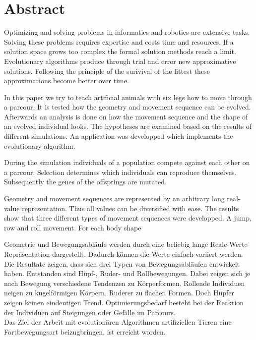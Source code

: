 %
%


\chapter{Abstract}

  Optimizing and solving problems in informatics and robotics are extensive tasks.
  Solving these problems requires expertise and costs time and resources.
  If a solution space grows too complex the formal solution methods reach a limit.
  Evolutionary algorithms produce through trial and error new approximative solutions.
  Following the principle of the surivival of the fittest these approximations become better over time.

  \smallskip

  In this paper we try to teach artificial animals with six legs how to move through a parcour.
  It is tested how the geometry and movement sequence can be evolved.
  Afterwards an analysis is done on how the movement sequence and the shape of an evolved individual looks.
  The hypotheses are examined based on the results of different simulations.
  An application was developped which implements the evolutionary algorithm.

  \smallskip

  During the simulation individuals of a population compete against each other on a parcour.
  Selection determines which individuals can reproduce themselves.
  Subsequently the genes of the offsprings are mutated.

  \smallskip

  Geometry and movement sequences are represented by an arbitrary long real-value representation.
  Thus all values can be diversified with ease.
  The results show that three different types of movement sequences were developped.
  A jump, row and roll movement.
  For each body shape 

  Geometrie und Bewegungsabläufe werden durch eine beliebig lange Reale-Werte-Repräsentation dargestellt.
  Dadurch können die Werte einfach variiert werden.
  Die Resultate zeigen, dass sich drei Typen von Bewegungsabläufen entwickelt haben.
  Entstanden sind Hüpf-, Ruder- und Rollbewegungen.
  Dabei zeigen sich je nach Bewegung verschiedene Tendenzen zu Körperformen.
  Rollende Individuen neigen zu kugelförmigen Körpern, Ruderer zu flachen Formen.
  Doch Hüpfer zeigen keinen eindeutigen Trend.
  Optimierungsbedarf besteht bei der Reaktion der Individuen auf Steigungen oder Gefälle im Parcours.
  \\
  Das Ziel der Arbeit mit evolutionären Algorithmen artifiziellen Tieren eine Fortbewegungsart beizugbringen,
  ist erreicht worden.
